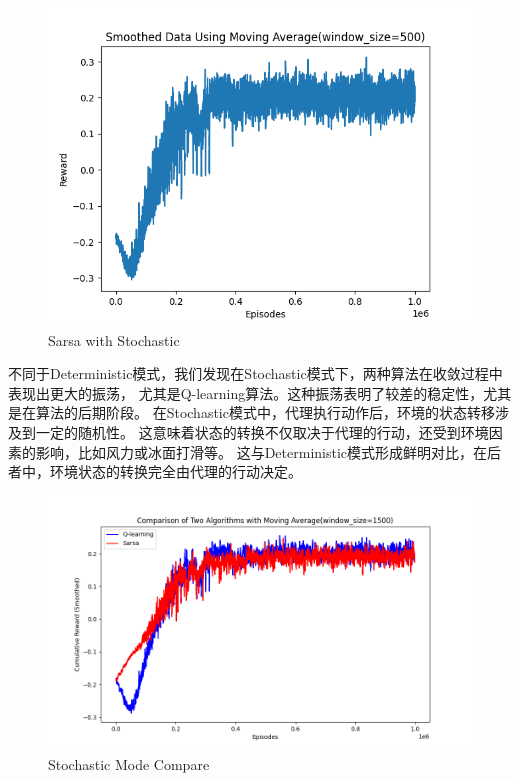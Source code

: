 \documentclass{thuemp}
\begin{document}
\begin{figure}[H]
  \centering
  \includegraphics[width=1\linewidth]{./img/result/s/ss.png}
  \caption{Sarsa with Stochastic}
\end{figure}

不同于Deterministic模式，我们发现在Stochastic模式下，两种算法在收敛过程中表现出更大的振荡，
尤其是Q-learning算法。这种振荡表明了较差的稳定性，尤其是在算法的后期阶段。
在Stochastic模式中，代理执行动作后，环境的状态转移涉及到一定的随机性。
这意味着状态的转换不仅取决于代理的行动，还受到环境因素的影响，比如风力或冰面打滑等。
这与Deterministic模式形成鲜明对比，在后者中，环境状态的转换完全由代理的行动决定。
\begin{figure}[H]
  \centering
  \includegraphics[width=1\linewidth]{./img/result/s/compare-s.png}
  \caption{Stochastic Mode Compare}
\end{figure}
\end{document}
